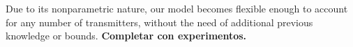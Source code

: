 \documentclass[a4paper]{article}
\begin{document}
Due to its nonparametric nature, our model becomes flexible enough to account for any number of transmitters, without the need of additional previous knowledge or bounds.  \textbf{Completar con experimentos.}







\end{document}
